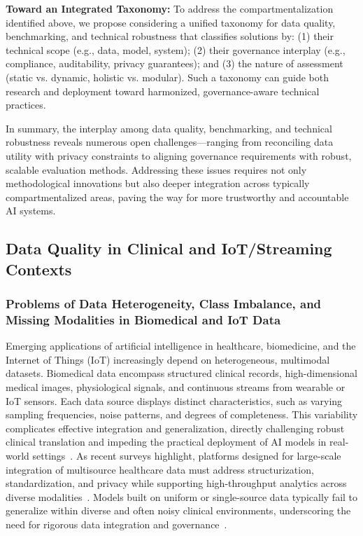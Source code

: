 \documentclass[sigconf]{acmart}
\begin{document}
\textbf{Toward an Integrated Taxonomy:} To address the compartmentalization identified above, we propose considering a unified taxonomy for data quality, benchmarking, and technical robustness that classifies solutions by: (1) their technical scope (e.g., data, model, system); (2) their governance interplay (e.g., compliance, auditability, privacy guarantees); and (3) the nature of assessment (static vs. dynamic, holistic vs. modular). Such a taxonomy can guide both research and deployment toward harmonized, governance-aware technical practices.

In summary, the interplay among data quality, benchmarking, and technical robustness reveals numerous open challenges---ranging from reconciling data utility with privacy constraints to aligning governance requirements with robust, scalable evaluation methods. Addressing these issues requires not only methodological innovations but also deeper integration across typically compartmentalized areas, paving the way for more trustworthy and accountable AI systems.

\subsection{Data Quality in Clinical and IoT/Streaming Contexts}

\subsubsection{Problems of Data Heterogeneity, Class Imbalance, and Missing Modalities in Biomedical and IoT Data}

Emerging applications of artificial intelligence in healthcare, biomedicine, and the Internet of Things (IoT) increasingly depend on heterogeneous, multimodal datasets. Biomedical data encompass structured clinical records, high-dimensional medical images, physiological signals, and continuous streams from wearable or IoT sensors. Each data source displays distinct characteristics, such as varying sampling frequencies, noise patterns, and degrees of completeness. This variability complicates effective integration and generalization, directly challenging robust clinical translation and impeding the practical deployment of AI models in real-world settings~\cite{ref78,ref82,ref83}. As recent surveys highlight, platforms designed for large-scale integration of multisource healthcare data must address structurization, standardization, and privacy while supporting high-throughput analytics across diverse modalities~\cite{ref84}. Models built on uniform or single-source data typically fail to generalize within diverse and often noisy clinical environments, underscoring the need for rigorous data integration and governance~\cite{ref83,ref84}.
\end{document}
